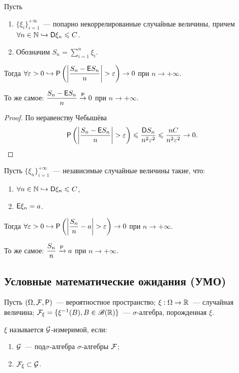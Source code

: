 \begin{theorem}
	Пусть 
	\begin{enumerate}
	    \item $\{\xi_i\}_{i=1}^{+\infty}$~---  попарно некоррелированные случайные величины, причем $\forall n \in \N \hookrightarrow \D \xi_n \leqslant C$.
	    \item Обозначим $S_n = \sum\limits_{i=1}^n \xi_i$.
	\end{enumerate} 
	Тогда $\forall \varepsilon > 0 \hookrightarrow \P \left(\left| \dfrac{S_n - \E S_n}{n} \right| > \varepsilon\right) \rightarrow 0$ при $n \rightarrow +\infty$.
	
	То же самое: $\dfrac{S_n - \E S_n}{n} \overset{\P}{\rightarrow} 0$ при $n \rightarrow +\infty$\Big.
	\begin{proof}
		По неравенству Чебышёва 
		$$\P \left(\left| \dfrac{S_n - \E S_n}{n} \right| > \varepsilon\right) \leqslant \dfrac{\D S_n}{n^2 \varepsilon^2} \leqslant \dfrac{nC}{n^2\varepsilon^2} \rightarrow 0.$$ 
	\end{proof}
\end{theorem}

\begin{consequence}
	Пусть $\{ \xi_n \}_{i=1}^{+\infty}$~--- независимые случайные величины такие, что:
	\begin{enumerate}
	    \item $\forall n \in \N \hookrightarrow \D \xi_n \leqslant C$,
	    \item $\E \xi_n = a$.
	\end{enumerate} 
	 Тогда $\forall \varepsilon > 0 \hookrightarrow \P \left(\left| \dfrac{S_n}{n} - a \right| > \varepsilon\right) \rightarrow 0$ при $n \rightarrow +\infty$.	
		
	То же самое: $\dfrac{S_n}{n} \xrightarrow{\P} a$ при $n \rightarrow + \infty$. 
\end{consequence}

\subsection{Условные математические ожидания (УМО)}
Пусть $(\Omega, \F, \P)$~--- вероятностное пространство; $\xi: \Omega \rightarrow \R$~--- случайная величина; $\F_\xi = \{ \xi^{-1}(B), B \in \B(\R) \}$~--- $\sigma$-алгебра, порожденная $\xi$. 

\begin{definition}
    $\xi$ называется $\G$-измеримой, если:
    \begin{enumerate}
        \item $\G$~--- под$\sigma$-алгебра $\sigma$-алгебры $\F$;
        \item $\F_\xi \subset \G$.
    \end{enumerate}
\end{definition}

